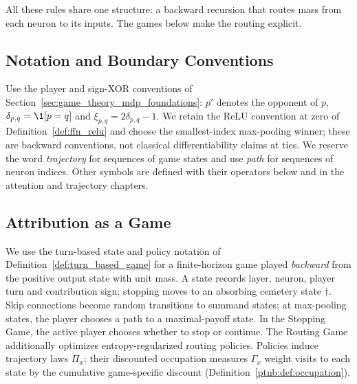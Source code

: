 All these rules share one structure: a backward recursion that routes mass from each neuron to its
inputs. The games below make the routing explicit.

\subsection{Notation and Boundary Conventions}\label{ptnb:app:notation}\label{ptnb:app:notation-identities}
Use the player and sign-XOR conventions of Section~\ref{sec:game_theory_mdp_foundations}: $p'$ denotes the opponent of $p$,
$\delta_{p,q}=\1[p=q]$ and $\xi_{p,q}=2\delta_{p,q}-1$.
We retain the ReLU convention at zero of Definition~\ref{def:ffn_relu} and choose the smallest-index max-pooling
winner; these are backward conventions, not classical differentiability claims at ties.
We reserve the word \emph{trajectory} for sequences of game states and use \emph{path} for sequences of neuron indices.
Other symbols are defined with their operators below and in the attention and trajectory chapters.

\subsection{Attribution as a Game}\label{ptnb:sec:game}

We use the turn-based state and policy notation of Definition~\ref{def:turn_based_game} for a finite-horizon game played \emph{backward} from the positive output state with unit mass. A state records layer, neuron, player turn and contribution sign;
stopping moves to an absorbing cemetery state $\dagger$. Skip connections become random transitions to
summand states; at max-pooling states, the player chooses a path to a maximal-payoff state. In the Stopping Game, the active player chooses whether to stop or continue. The Routing Game additionally optimizes entropy-regularized routing policies. Policies induce trajectory
laws $\Pi_x$; their discounted occupation measures $\Gamma_x$ weight visits to each state by the
cumulative game-specific discount (Definition~\ref{ptnb:def:occupation}).

